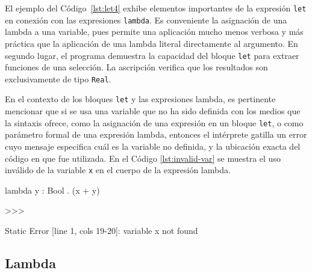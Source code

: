 El ejemplo del Código~\ref{lst:let4} exhibe elementos importantes de la expresión
\lstinline|let| en conexión con las expresiones \lstinline|lambda|. Es
conveniente la asignación de una lambda a una variable, pues
permite una aplicación mucho menos verbosa y más práctica que la
aplicación de una lambda literal directamente al argumento. En segundo
lugar, el programa demuestra la capacidad del bloque \lstinline|let|
para extraer funciones de una selección.  La ascripción verifica que
los resultados son exclusivamente de tipo \lstinline|Real|.



En el contexto de los bloques \lstinline|let| y las expresiones
lambda, es pertinente mencionar que si se usa una variable que no ha
sido definida con los medios que la sintaxis ofrece, como la
asignación de una expresión en un bloque \lstinline|let|, o como
parámetro formal de una expresión lambda, entonces el intérprete
gatilla un error cuyo mensaje especifica cuál es la variable no
definida, y la ubicación exacta del código en que fue utilizada.  En
el Código \ref{lst:invalid-var} se muestra el uso inválido de la
variable \lstinline|x| en el cuerpo de la expresión lambda.

\begin{gplcblock}[caption={Uso de variable no definida},label={lst:invalid-var}]
lambda y : Bool . (x + y)

>>>

Static Error [line 1, cols 19-20]: variable x not found
\end{gplcblock}


\subsection{Lambda}

